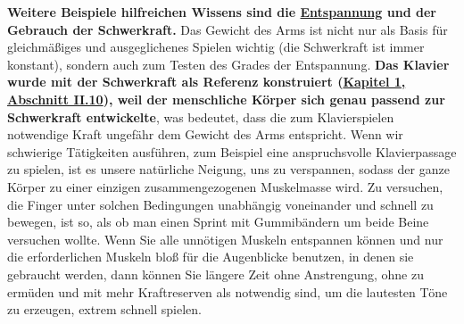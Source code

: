 \textbf{Weitere Beispiele hilfreichen Wissens sind die \hyperref[c1ii14]{Entspannung} und der Gebrauch der Schwerkraft.}
Das Gewicht des Arms ist nicht nur als Basis für gleichmäßiges und ausgeglichenes Spielen wichtig (die Schwerkraft ist immer konstant), sondern auch zum Testen des Grades der Entspannung.
\textbf{Das Klavier wurde mit der Schwerkraft als Referenz konstruiert (\hyperref[c1ii10]{Kapitel 1, Abschnitt II.10}), weil der menschliche Körper sich genau passend zur Schwerkraft entwickelte}, was bedeutet, dass die zum Klavierspielen notwendige Kraft ungefähr dem Gewicht des Arms entspricht.
Wenn wir schwierige Tätigkeiten ausführen, zum Beispiel eine anspruchsvolle Klavierpassage zu spielen, ist es unsere natürliche Neigung, uns zu verspannen, sodass der ganze Körper zu einer einzigen zusammengezogenen Muskelmasse wird.
Zu versuchen, die Finger unter solchen Bedingungen unabhängig voneinander und schnell zu bewegen, ist so, als ob man einen Sprint mit Gummibändern um beide Beine versuchen wollte.
Wenn Sie alle unnötigen Muskeln entspannen können und nur die erforderlichen Muskeln bloß für die Augenblicke benutzen, in denen sie gebraucht werden, dann können Sie längere Zeit ohne Anstrengung, ohne zu ermüden und mit mehr Kraftreserven als notwendig sind, um die lautesten Töne zu erzeugen, extrem schnell spielen. 

